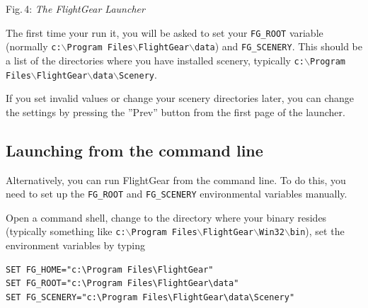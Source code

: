  \centerline{}
\smallskip
\noindent
Fig.\,4: \textit{The FlightGear Launcher}

\medskip

The first time your run it, you will be asked to set your \texttt{FG\_ROOT} variable
(normally \texttt{c:$\backslash$Program Files$\backslash$FlightGear$\backslash$data}) and \texttt{FG\_SCENERY}.
This should be a list of the directories where you have installed scenery, typically
\texttt{c:$\backslash$Program Files$\backslash$FlightGear$\backslash$data$\backslash$Scenery}.

If you set invalid values or change your scenery directories later, you can
change the settings by pressing the ''Prev'' button from the first page of
the launcher.

\subsection{Launching from the command line}

Alternatively, you can run FlightGear from the command line. To do this, you
need to set up the \texttt{FG\_ROOT} and \texttt{FG\_SCENERY} environmental
variables manually.

Open a command shell, change to the directory where your binary resides
(typically something like
\texttt{c:$\backslash$Program Files$\backslash$FlightGear$\backslash$Win32$\backslash$bin}),
set the environment variables by typing
\medskip

\begin{verbatim}
SET FG_HOME="c:\Program Files\FlightGear"
SET FG_ROOT="c:\Program Files\FlightGear\data"
SET FG_SCENERY="c:\Program Files\FlightGear\data\Scenery"
\end{verbatim}
\medskip

